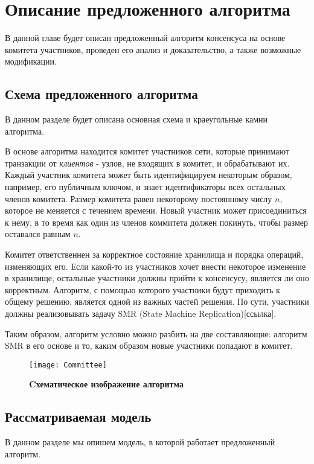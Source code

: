 
\chapter{Описание предложенного алгоритма}  \label{chapter2}
В данной главе будет описан предложенный алгоритм консенсуса на основе комитета участников, проведен его анализ и доказательство,
а также возможные модификации.

\section{Схема предложенного алгоритма}
В данном разделе будет описана основная схема и краеугольные камни алгоритма.

В основе алгоритма находится комитет участников сети, 
которые принимают транзакции от \textit{клиентов} - узлов, не входящих в комитет, 
и обрабатывают их.
Каждый участник комитета может быть идентифицируем некоторым образом, например, его публичным ключом, и знает идентификаторы всех остальных членов комитета.
Размер комитета равен некоторому постоянному числу $n$, которое не меняется с течением времени. 
Новый участник может присоединиться к нему, в то время как один из членов коммитета должен покинуть, чтобы размер оставался равным $n$.

Комитет ответственнен за корректное состояние хранилища и порядка операций, изменяющих его.
Если какой-то из участников хочет внести некоторое изменение в хранилище, остальные участники должны прийти к консенсусу, является ли оно корректным. 
Алгоритм, с помощью которого участники будут приходить к общему решению, является одной из важных частей решения.  
По сути, участники должны реализовывать задачу SMR (State Machine Replication)[ссылка].

Таким образом, алгоритм условно можно разбить на две составляющие: алгоритм SMR в его основе и то, каким образом новые участники попадают в комитет.

\begin{figure}[!h]
\texttt{[image: Committee]}
\caption{\textbf{Cхематическое изображение алгоритма}}
\label{fig:committee}
\end{figure}

\section{Рассматриваемая модель}
В данном разделе мы опишем модель, в которой работает предложенный алгоритм.

